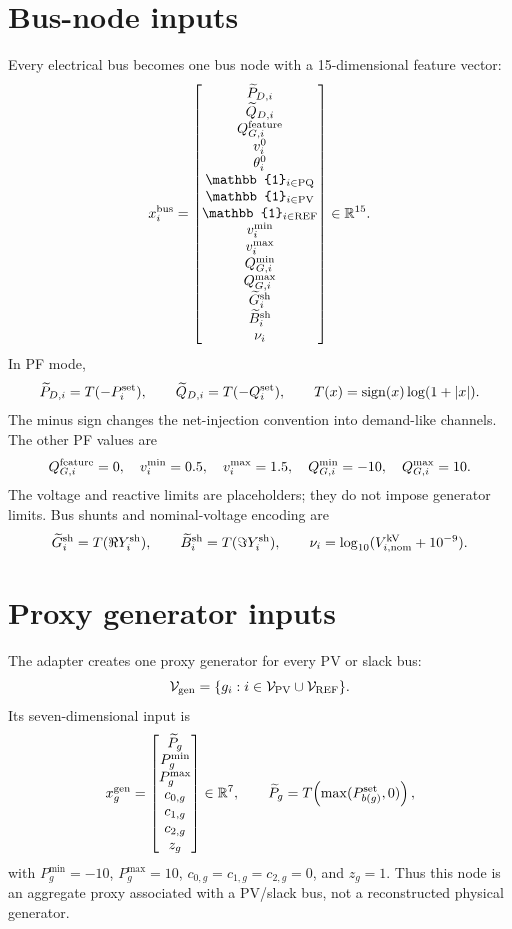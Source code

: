 \documentclass[11pt,a4paper]{article}
\newcommand{\R}{\mathbb{R}}
\newcommand{\ind}{\mathbb{1}}
\begin{document}
\section{Bus-node inputs}
Every electrical bus becomes one bus node with a 15-dimensional feature vector:
\[
x_i^{\rm bus}=\begin{bmatrix}
\widetilde P_{D,i}\\\widetilde Q_{D,i}\\Q_{G,i}^{\rm feature}\\v_i^0\\\theta_i^0\\
\ind_{i\in\mathrm{PQ}}\\\ind_{i\in\mathrm{PV}}\\\ind_{i\in\mathrm{REF}}\\
v_i^{\min}\\v_i^{\max}\\Q_{G,i}^{\min}\\Q_{G,i}^{\max}\\
\widetilde G_i^{\rm sh}\\\widetilde B_i^{\rm sh}\\\nu_i
\end{bmatrix}\in\R^{15}.
\]
In PF mode,
\[
\widetilde P_{D,i}=T(-P_i^{\rm set}),\qquad \widetilde Q_{D,i}=T(-Q_i^{\rm set}),\qquad
T(x)=\operatorname{sign}(x)\log(1+|x|).
\]
The minus sign changes the net-injection convention into demand-like channels. The other PF values are
\[
Q_{G,i}^{\rm feature}=0,\quad v_i^{\min}=0.5,\quad v_i^{\max}=1.5,\quad
Q_{G,i}^{\min}=-10,\quad Q_{G,i}^{\max}=10.
\]
The voltage and reactive limits are placeholders; they do not impose generator limits. Bus shunts and nominal-voltage encoding are
\[
\widetilde G_i^{\rm sh}=T(\Re Y_i^{\rm sh}),\qquad \widetilde B_i^{\rm sh}=T(\Im Y_i^{\rm sh}),\qquad
\nu_i=\log_{10}(V_{i,\rm nom}^{\rm kV}+10^{-9}).
\]

\section{Proxy generator inputs}
The adapter creates one proxy generator for every PV or slack bus:
\[
\mathcal V_{\rm gen}=\{g_i:i\in\mathcal V_{\rm PV}\cup\mathcal V_{\rm REF}\}.
\]
Its seven-dimensional input is
\[
x_g^{\rm gen}=\begin{bmatrix}\widetilde P_g\\P_g^{\min}\\P_g^{\max}\\c_{0,g}\\c_{1,g}\\c_{2,g}\\z_g\end{bmatrix}\in\R^7,
\qquad \widetilde P_g=T\!\left(\max(P_{b(g)}^{\rm set},0)\right),
\]
with $P_g^{\min}=-10$, $P_g^{\max}=10$, $c_{0,g}=c_{1,g}=c_{2,g}=0$, and $z_g=1$. Thus this node is an aggregate proxy associated with a PV/slack bus, not a reconstructed physical generator.
\end{document}
